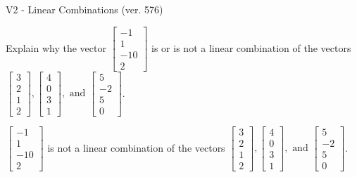 \begin{exercise}
  \begin{exerciseTitle}V2 - Linear Combinations (ver. 576)\end{exerciseTitle}
  \begin{exerciseStatement}
    Explain why the vector \(\left[\begin{array}{c}
-1 \\
1 \\
-10 \\
2
\end{array}\right]\)  is or is not a linear 
	combination of the vectors \(\left[\begin{array}{c}
3 \\
2 \\
1 \\
2
\end{array}\right] , \left[\begin{array}{c}
4 \\
0 \\
3 \\
1
\end{array}\right] , \text{ and } \left[\begin{array}{c}
5 \\
-2 \\
5 \\
0
\end{array}\right]\).
	


  \end{exerciseStatement}
  \begin{exerciseAnswer}
   \(\left[\begin{array}{c}
-1 \\
1 \\
-10 \\
2
\end{array}\right]\) 
  	 is not  
	a linear combination of the vectors \(\left[\begin{array}{c}
3 \\
2 \\
1 \\
2
\end{array}\right] , \left[\begin{array}{c}
4 \\
0 \\
3 \\
1
\end{array}\right] , \text{ and } \left[\begin{array}{c}
5 \\
-2 \\
5 \\
0
\end{array}\right]\).

	
  


  \end{exerciseAnswer}
\end{exercise}